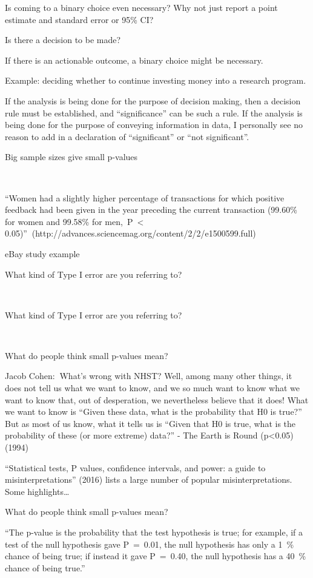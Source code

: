\documentclass[
  letterpaper,
  DIV=11,
  numbers=noendperiod]{scrreprt}
\begin{document}
Is coming to a binary choice even necessary? Why not just report a point
estimate and standard error or 95\% CI?

Is there a decision to be made?

If there is an actionable outcome, a binary choice might be necessary.

Example: deciding whether to continue investing money into a research
program.

If the analysis is being done for the purpose of decision making, then a
decision rule must be established, and ``significance'' can be such a
rule. If the analysis is being done for the purpose of conveying
information in data, I personally see no reason to add in a declaration
of ``significant'' or ``not significant''.

Big sample sizes give small p-values

~



``Women had a slightly higher percentage of transactions for which
positive feedback had been given in the year preceding the current
transaction (99.60\% for women and 99.58\% for men,~P~\textless{}
0.05)''(http://advances.sciencemag.org/content/2/2/e1500599.full)

eBay study example

What kind of Type I error are you referring to?

~

What kind of Type I error are you referring to?

~

What do people think small p-values mean?

Jacob Cohen:What's wrong with NHST? Well, among many other things, it
does not tell us what we want to know, and we so much want to know what
we want to know that, out of desperation, we nevertheless believe that
it does! What we want to know is ``Given these data, what is the
probability that H0 is true?'' But as most of us know, what it tells us
is ``Given that H0 is true, what is the probability of these (or more
extreme) data?'' - The Earth is Round (p\textless0.05) (1994)

``Statistical tests, P values, confidence intervals, and power: a guide
to misinterpretations'' (2016) lists a large number of popular
misinterpretations. Some highlights\ldots{}

What do people think small p-values mean?

``The p-value is the probability that the test hypothesis is true; for
example, if a test of the null hypothesis gave P~=~0.01, the null
hypothesis has only a 1~\% chance of being true; if instead it gave
P~=~0.40, the null hypothesis has a 40~\% chance of being true.''
\end{document}
